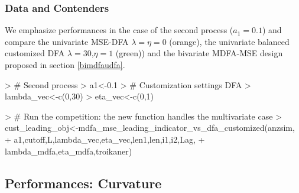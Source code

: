 \documentclass[a4paper]{book}
\begin{document}
\subsubsection{Data and Contenders}

We emphasize performances in the case of the second process ($a_1=0.1$) and compare the univariate MSE-DFA $\lambda=\eta=0$ (orange), the univariate balanced customized DFA $\lambda=30$,$\eta=1$ (green)) and the bivariate MDFA-MSE design proposed in section \ref{bimdfaudfa}.
\begin{Schunk}
\begin{Sinput}
> # Second process
> a1<-0.1
> # Customization settings DFA
> lambda_vec<-c(0,30)
> eta_vec<-c(0,1)
\end{Sinput}
\end{Schunk}
\begin{Schunk}
\begin{Sinput}
> # Run the competition: the new function handles the multivariate case
> cust_leading_obj<-mdfa_mse_leading_indicator_vs_dfa_customized(anzsim,
+                   a1,cutoff,L,lambda_vec,eta_vec,len1,len,i1,i2,Lag,
+                   lambda_mdfa,eta_mdfa,troikaner)  
\end{Sinput}
\end{Schunk}



\subsection{Performances: Curvature}
\end{document}
